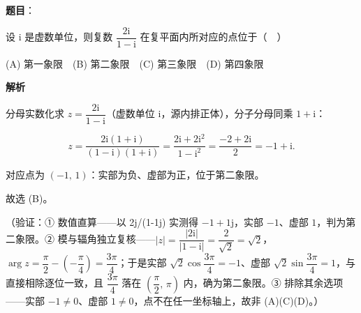 \begin{answer}

\textbf{题目}：

设 \(\mathrm{i}\) 是虚数单位，则复数 \(\dfrac{2\mathrm{i}}{1-\mathrm{i}}\) 在复平面内所对应的点位于（　）

(A) 第一象限　(B) 第二象限　(C) 第三象限　(D) 第四象限

\textbf{解析}

分母实数化求 \(z=\dfrac{2\mathrm{i}}{1-\mathrm{i}}\)（虚数单位 \(\mathrm{i}\)，源内排正体），分子分母同乘 \(1+\mathrm{i}\)：

\nopagebreak[4]
\[
z=\dfrac{2\mathrm{i}(1+\mathrm{i})}{(1-\mathrm{i})(1+\mathrm{i})}=\dfrac{2\mathrm{i}+2\mathrm{i}^{2}}{1-\mathrm{i}^{2}}=\dfrac{-2+2\mathrm{i}}{2}=-1+\mathrm{i}.
\]

对应点为 \((-1,\,1)\)：实部为负、虚部为正，位于第二象限。

故选 (B)。

（验证：① 数值直算——以 2j/(1-1j) 实测得 \(-1+1\mathrm{j}\)，实部 \(-1\)、虚部 \(1\)，判为第二象限。② 模与辐角独立复核——\(|z|=\dfrac{|2\mathrm{i}|}{|1-\mathrm{i}|}=\dfrac{2}{\sqrt{2}}=\sqrt{2}\)，\(\arg z=\dfrac{\pi}{2}-\left(-\dfrac{\pi}{4}\right)=\dfrac{3\pi}{4}\)；于是实部 \(\sqrt{2}\cos\dfrac{3\pi}{4}=-1\)、虚部 \(\sqrt{2}\sin\dfrac{3\pi}{4}=1\)，与直接相除逐位一致，且 \(\dfrac{3\pi}{4}\) 落在 \(\left(\dfrac{\pi}{2},\,\pi\right)\) 内，确为第二象限。③ 排除其余选项——实部 \(-1\neq 0\)、虚部 \(1\neq 0\)，点不在任一坐标轴上，故非 (A)(C)(D)。）


\end{answer}
